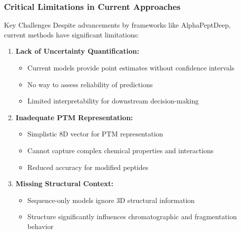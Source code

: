 \documentclass{beamer}
\begin{document}
\begin{frame}
\begin{columns}
  \end{columns}
\end{frame}

\begin{frame}
  \frametitle{Critical Limitations in Current Approaches}
  \begin{block}{Key Challenges}
    Despite advancements by frameworks like AlphaPeptDeep, current methods have significant limitations:
  \end{block}
  \begin{enumerate}
    \item \textbf{Lack of Uncertainty Quantification:}
    \begin{itemize}
      \item Current models provide point estimates without confidence intervals
      \item No way to assess reliability of predictions
      \item Limited interpretability for downstream decision-making
    \end{itemize}
    \item \textbf{Inadequate PTM Representation:}
    \begin{itemize}
      \item Simplistic 8D vector for PTM representation
      \item Cannot capture complex chemical properties and interactions
      \item Reduced accuracy for modified peptides
    \end{itemize}
    \item \textbf{Missing Structural Context:}
    \begin{itemize}
      \item Sequence-only models ignore 3D structural information
      \item Structure significantly influences chromatographic and fragmentation behavior
    \end{itemize}
  \end{enumerate}
\end{frame}
\end{document}
